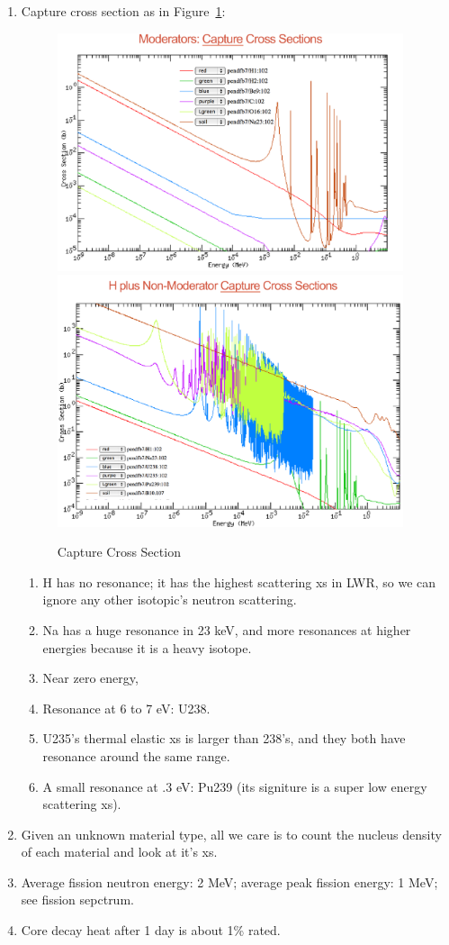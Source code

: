 \documentclass{school-22.211-notes}
\begin{document}
\begin{enumerate}
\item Capture cross section as in Figure~\ref{capture-xs}: 
\begin{figure}
  \centering
  \includegraphics[width=4in]{images/capture-xs.png}
  \\
  \includegraphics[width=4in]{images/capture-xs-2.png}
  \caption{Capture Cross Section} \label{capture-xs}
\end{figure}
\begin{enumerate}
\item H has no resonance; it has the highest scattering xs in LWR, so we can ignore any other isotopic's neutron scattering.   
\item Na has a huge resonance in 23 keV, and more resonances at higher energies because it is a heavy isotope.
\item Near zero energy,
\item Resonance at 6 to 7 eV: U238. 
\item U235's thermal elastic xs is larger than 238's, and they both have resonance around the same range.   
\item A small resonance at .3 eV: Pu239 (its signiture is a super low energy scattering xs). 
\end{enumerate}

\item Given an unknown material type, all we care is to count the nucleus density of each material and look at it's xs. 
\item Average fission neutron energy: 2 MeV; average peak fission energy: 1 MeV; see fission sepctrum. 

\item Core decay heat after 1 day is about 1\% rated. 


\end{enumerate}
\end{document}
